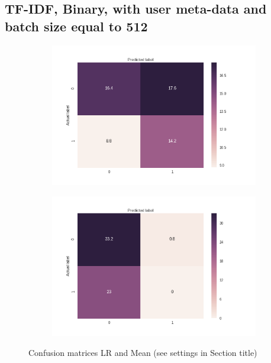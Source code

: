 \documentclass[sigconf]{acmart-txmm}
\begin{document}
\subsection{TF-IDF, Binary, with user meta-data and batch size equal to 512}

\begin{figure}[H]
\centering
\begin{subfigure}
  \centering
  \includegraphics[width=1\linewidth]{report/img/conf_matrices/keywords_tfidf_binary_0_1_512_LR.png}
  \label{fig:keywords_tfidf_binary_0_0_512_LR}
\end{subfigure}%
\begin{subfigure}
  \centering
  \includegraphics[width=1\linewidth]{report/img/conf_matrices/keywords_tfidf_binary_0_1_512_mean.png}
  \label{fig:keywords_tfidf_binary_0_0_512_mean}
\end{subfigure}
\caption{Confusion matrices LR and Mean (see settings in Section title)}
\label{fig:keywords_tfidf_binary_0_0_512}
\end{figure}
\end{document}
